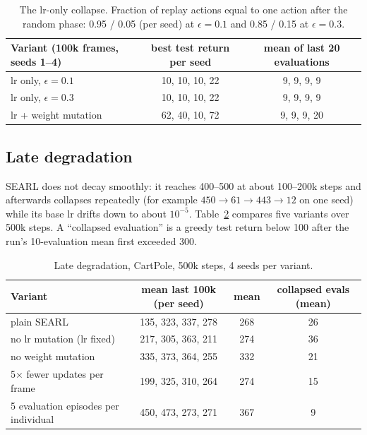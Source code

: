 \documentclass[11pt]{article}
\begin{document}
\begin{table}[h]
\centering\small
\begin{tabular}{lcc}
\toprule
Variant (100k frames, seeds 1--4) & best test return per seed & mean of last 20 evaluations \\
\midrule
lr only, $\epsilon=0.1$            & 10, 10, 10, 22 & 9, 9, 9, 9 \\
lr only, $\epsilon=0.3$            & 10, 10, 10, 22 & 9, 9, 9, 9 \\
lr + weight mutation               & 62, 40, 10, 72 & 9, 9, 9, 20 \\
\bottomrule
\end{tabular}
\caption{The lr-only collapse. Fraction of replay actions equal to one action after the random phase: 0.95 / 0.05 (per seed)
at $\epsilon=0.1$ and 0.85 / 0.15 at $\epsilon=0.3$.}
\label{tab:lronly}
\end{table}

\subsection{Late degradation}
SEARL does not decay smoothly: it reaches 400--500 at about 100--200k steps and afterwards collapses repeatedly
(for example $450 \to 61 \to 443 \to 12$ on one seed) while its base lr drifts down to about $10^{-5}$.
Table~\ref{tab:degr} compares five variants over 500k steps. A ``collapsed evaluation'' is a greedy test return below 100
after the run's 10-evaluation mean first exceeded 300.

\begin{table}[h]
\centering\small
\begin{tabular}{lccc}
\toprule
Variant & mean last 100k (per seed) & mean & collapsed evals (mean) \\
\midrule
plain SEARL                       & 135, 323, 337, 278 & 268 & 26 \\
no lr mutation (lr fixed)         & 217, 305, 363, 211 & 274 & 36 \\
no weight mutation                & 335, 373, 364, 255 & 332 & 21 \\
5$\times$ fewer updates per frame & 199, 325, 310, 264 & 274 & 15 \\
5 evaluation episodes per individual & 450, 473, 273, 271 & 367 & 9 \\
\bottomrule
\end{tabular}
\caption{Late degradation, CartPole, 500k steps, 4 seeds per variant.}
\label{tab:degr}
\end{table}
\end{document}
